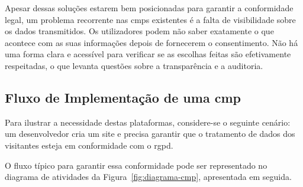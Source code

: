 Apesar dessas soluções estarem bem posicionadas para garantir a conformidade legal, um problema recorrente nas \acrshort{cmp}s existentes é a falta de visibilidade sobre os dados transmitidos. Os utilizadores podem não saber exatamente o que acontece com as suas informações depois de fornecerem o consentimento. Não há uma forma clara e acessível para verificar se as escolhas feitas são efetivamente respeitadas, o que levanta questões sobre a transparência e a auditoria.

\subsection{Fluxo de Implementação de uma \acrshort{cmp}}

Para ilustrar a necessidade destas plataformas, considere-se o seguinte cenário: um desenvolvedor cria um site e precisa garantir que o tratamento de dados dos visitantes esteja em conformidade com o \acrshort{rgpd}.

O fluxo típico para garantir essa conformidade pode ser representado no diagrama de atividades da Figura~\ref{fig:diagrama-cmp}, apresentada em seguida.

